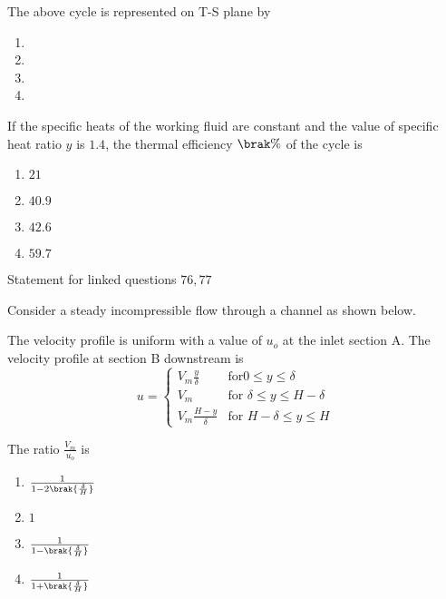                         \item The above cycle is represented on T-S plane by
                        \begin{enumerate}
                            \item 
                             \item 
                              \item 
                               \item 
                        \end{enumerate}
                          \item If the specific heats of the working fluid are constant and the value of specific heat ratio $y$ is $1.4$, the thermal efficiency $\brak{\%}$ of the cycle is
                            \begin{enumerate}
                                \item $21$
                                \item $40.9$
                                \item $42.6$
                                \item $59.7$
                            \end{enumerate} 
                        Statement for linked questions $76,77 $


                        Consider a steady incompressible flow through a channel as shown below.
                        

                        The velocity profile is uniform with a value of $u_o$ at the inlet section A. The velocity profile at section B downstream is
                        $$
                        u = 
                        \begin{cases} 
                        V_m\frac{y}{\delta} & \text{for}  0 \leq y \leq \delta \\ 
                        V_m & \text{for } \delta \leq y \leq H-\delta \\ 
                        V_m\frac{H-y}{\delta} & \text{for } H-\delta \leq y \leq H 
                        \end{cases}
                        $$
                            \item The ratio $\frac{V_m}{u_o}$ is
                            \begin{enumerate}
                                \item $\frac{1}{1 - 2\brak{\frac{\delta}{H}}}$
                                \item $1$
                                \item $\frac{1}{1 - \brak{\frac{\delta}{H}}}$
                                \item $\frac{1}{1 + \brak{\frac{\delta}{H}}}$
                            \end{enumerate}
                            
